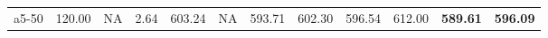 \documentclass[aspectratio=1610]{beamer}
\begin{document}
\begin{frame}
\begin{table}[]
{\begin{tabular}{lrrrrrrrrrrr}
a5-50                                          & 120.00       & \multicolumn{1}{r|}{NA}                                     & 2.64              & 603.24          & \multicolumn{1}{r|}{NA}                                     & 593.71          & \multicolumn{1}{r|}{602.30}   & 596.54          & \multicolumn{1}{r|}{612.00}                                 & \textbf{589.61} & {\color[HTML]{FE0000} \textbf{596.09}} \\

\end{tabular}}
\end{table}
\end{frame}
\end{document}
